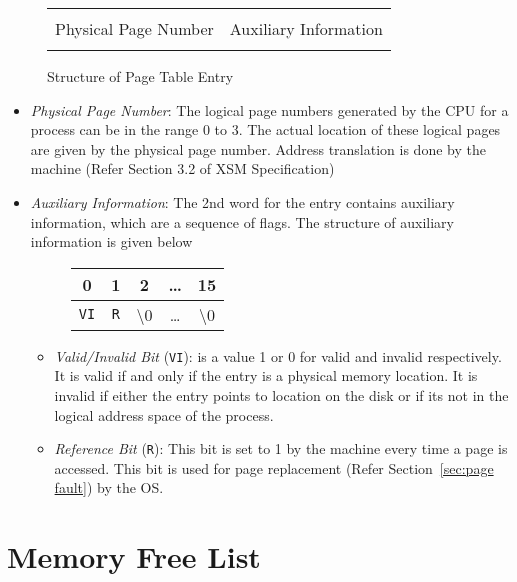 \documentclass[10pt]{report}
\begin{document}
		\begin{figure}[htp!]
		\centering
		\begin{tabular}{|c|c|}
		\hline
		  	 	& 			\\ 
		 	Physical Page Number & Auxiliary Information  \\
			 	& 			\\  \hline
		\end{tabular}
		\caption{Structure of Page Table Entry}
		\label{fig:pagetable entry}
	\end{figure}

\begin{itemize}
	\item \textit{Physical Page Number}: The logical page numbers generated by the CPU for a process can be in the range 0 to 3. The actual location of these logical pages are given by the physical page number. Address translation is done by the machine (Refer Section 3.2 of XSM Specification)
	
	\item \textit{Auxiliary Information}: The 2nd word for the entry contains auxiliary information, which are a sequence of flags. The structure of auxiliary information is given below
			\begin{figure}[htp!]
		\centering
		\begin{tabular}{|c|c|c|c|c|}
		0 & 1 & 2 & \ldots & 15 \\
		\hline
		\texttt{VI} & \texttt{R} & \textbackslash 0 & \ldots &  \textbackslash 0 \\
		\hline
		\end{tabular}
		\end{figure}
	
		\begin{itemize}
			\item \textit{Valid/Invalid Bit} (\texttt{VI}): is a value 1 or 0 for valid and invalid respectively. It is valid if and only if the entry is a physical memory location. It is invalid if either the entry points to location on the disk or if its not in the logical address space of the process.
			\item \textit{Reference Bit} (\texttt{R}): This bit is set to 1 by the machine every time a page is accessed. This bit is used for page replacement (Refer Section~\ref{sec:page fault}) by the OS. 
		\end{itemize}

\end{itemize}
	
\section{Memory Free List}
\label{sec:mem free list}
\end{document}
